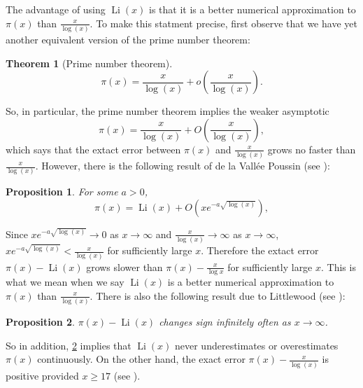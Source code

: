 \documentclass[12pt]{book}
\newtheorem{theorem}{Theorem}[section]
\newtheorem{proposition}{Proposition}[section]
\theoremstyle{definition}\newframedtheorem{method}{Method}
\newcommand{\<}{\langle}
\renewcommand{\>}{\rangle}
\DeclareMathOperator{\Li}{\mathrm{Li}}
\begin{document}
      The advantage of using $\Li(x)$ is that it is a better numerical approximation to $\pi(x)$ than $\frac{x}{\log(x)}$. To make this statment precise, first observe that we have yet another equivalent version of the prime number theorem:

      \begin{theorem}[Prime number theorem]
        \phantom{ }
        \[
          \pi(x) = \frac{x}{\log(x)}+o\left(\frac{x}{\log(x)}\right).
        \]
      \end{theorem}

      So, in particular, the prime number theorem implies the weaker asymptotic
      \[
        \pi(x) = \frac{x}{\log(x)}+O\left(\frac{x}{\log(x)}\right),
      \]
      which says that the extact error between $\pi(x)$ and $\frac{x}{\log(x)}$ grows no faster than $\frac{x}{\log(x)}$. However, there is the following result of de la Vall\'ee Poussin (see \cite{poussin1899fonction}):

      \begin{proposition}
        For some $a > 0$,
        \[
          \pi(x) = \Li(x)+O\left(xe^{-a\sqrt{\log(x)}}\right),
        \]
      \end{proposition}
      
      Since $xe^{-a\sqrt{\log(x)}} \to 0$ as $x \to \infty$ and $\frac{x}{\log(x)} \to \infty$ as $x \to \infty$, $xe^{-a\sqrt{\log(x)}} < \frac{x}{\log(x)}$ for sufficiently large $x$. Therefore the extact error $\pi(x)-\Li(x)$ grows slower than $\pi(x)-\frac{x}{\log{x}}$ for sufficiently large $x$. This is what we mean when we say $\Li(x)$ is a better numerical approximation to $\pi(x)$ than $\frac{x}{\log(x)}$. There is also the following result due to Littlewood (see \cite{littlewood1914distribution}):

      \begin{proposition}\label{thm:Littlewood_Li_approximation_theorem}
        $\pi(x)-\Li(x)$ changes sign infinitely often as $x \to \infty$.
      \end{proposition}

      So in addition, \cref{thm:Littlewood_Li_approximation_theorem} implies that $\Li(x)$ never underestimates or overestimates $\pi(x)$ continuously. On the other hand, the exact error $\pi(x)-\frac{x}{\log(x)}$ is positive provided $x \ge 17$ (see \cite{rosser1962approximate}).
\end{document}

